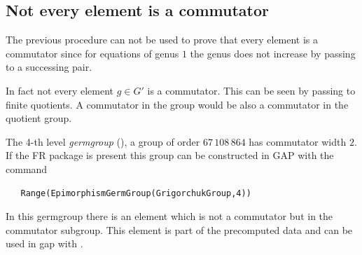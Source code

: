 \documentclass[a4paper,11pt]{amsart}
\begin{document}
\subsection{Not every element is a commutator}
The previous procedure can not be used to prove that every element is a
commutator since for equations of genus $1$ the 
genus does not increase by passing to a successing pair. 

In fact not every element $g\in G'$ is a commutator. This can be seen by
passing to finite quotients. A commutator in the group would be also a
commutator in the quotient group. 

The 4-th level \emph{germgroup} (\cite{Erschler:BoundaryBehavior}), %
a group of order $67\,108\,864$ has commutator width $2$.
If the FR package is present this group can be constructed in GAP with 
the command 
\begin{lstlisting}
   Range(EpimorphismGermGroup(GrigorchukGroup,4))
\end{lstlisting}
In this germgroup there is an element which is not a commutator 
but in the commutator subgroup. This element is part of the
precomputed data and can be used in gap with
.
\end{document}

